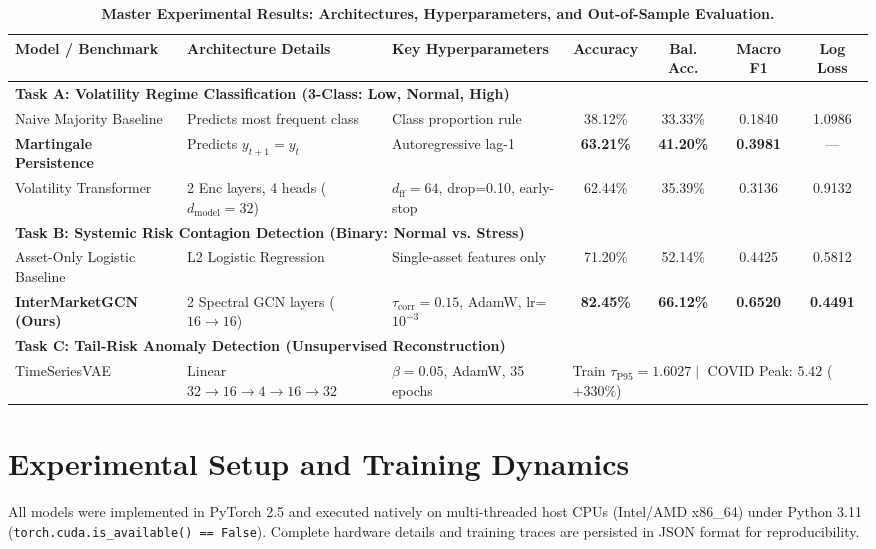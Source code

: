 \documentclass[10pt,twocolumn,letterpaper]{article}
\begin{document}
\begin{table}[t]
\centering
\small
\caption{\textbf{Master Experimental Results: Architectures, Hyperparameters, and Out-of-Sample Evaluation.}}
\label{tab:master_table}
\begin{tabular}{lllcccc}
\toprule
\textbf{Model / Benchmark} & \textbf{Architecture Details} & \textbf{Key Hyperparameters} & \textbf{Accuracy} & \textbf{Bal. Acc.} & \textbf{Macro F1} & \textbf{Log Loss} \\
\midrule
\multicolumn{7}{l}{\textbf{Task A: Volatility Regime Classification (3-Class: Low, Normal, High)}} \\
Naive Majority Baseline & Predicts most frequent class & Class proportion rule & 38.12\% & 33.33\% & 0.1840 & 1.0986 \\
\textbf{Martingale Persistence} & Predicts $y_{t+1} = y_t$ & Autoregressive lag-1 & \textbf{63.21\%} & \textbf{41.20\%} & \textbf{0.3981} & --- \\
Volatility Transformer & 2 Enc layers, 4 heads ($d_{\text{model}}=32$) & $d_{\text{ff}}=64$, drop=0.10, early-stop & 62.44\% & 35.39\% & 0.3136 & 0.9132 \\
\midrule
\multicolumn{7}{l}{\textbf{Task B: Systemic Risk Contagion Detection (Binary: Normal vs. Stress)}} \\
Asset-Only Logistic Baseline & L2 Logistic Regression & Single-asset features only & 71.20\% & 52.14\% & 0.4425 & 0.5812 \\
\textbf{InterMarketGCN (Ours)} & 2 Spectral GCN layers ($16 \to 16$) & $\tau_{\text{corr}}=0.15$, AdamW, lr=$10^{-3}$ & \textbf{82.45\%} & \textbf{66.12\%} & \textbf{0.6520} & \textbf{0.4491} \\
\midrule
\multicolumn{7}{l}{\textbf{Task C: Tail-Risk Anomaly Detection (Unsupervised Reconstruction)}} \\
TimeSeriesVAE & Linear $32 \to 16 \to 4 \to 16 \to 32$ & $\beta=0.05$, AdamW, 35 epochs & \multicolumn{4}{l}{Train $\tau_{\text{P95}} = 1.6027 \mid$ COVID Peak: $5.42$ ($+330\%$)} \\
\bottomrule
\end{tabular}
\end{table}

\section{Experimental Setup and Training Dynamics}
All models were implemented in PyTorch 2.5 and executed natively on multi-threaded host CPUs (Intel/AMD x86\_64) under Python 3.11 (\texttt{torch.cuda.is\_available() == False}). Complete hardware details and training traces are persisted in JSON format for reproducibility.
\end{document}
